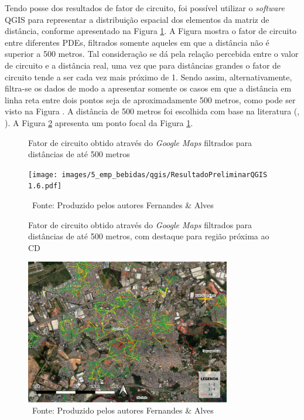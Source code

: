 Tendo posse dos resultados de fator de circuito, foi possível utilizar o \textit{software} QGIS para representar a distribuição espacial dos elementos da matriz de distância, conforme apresentado na Figura \ref{fig:FC_maps2}. 
A Figura mostra o fator de circuito entre diferentes PDEs, filtrados somente aqueles em que a distância não é superior a 500 metros. 
% 
Tal consideração se dá pela relação percebida entre o valor de circuito e a distância real, uma vez que para distâncias grandes o fator de circuito tende a ser cada vez mais próximo de 1.
%
Sendo assim, alternativamente, filtra-se os dados de modo a apresentar somente os casos em que a distância em linha reta entre dois pontos seja de aproximadamente 500 metros, como pode ser visto na Figura . 
%
A distância de 500 metros foi escolhida com base na literatura (, \citeyear{AMARAL2020102916}). 
%
A Figura \ref{fig:FC_maps3} apresenta um ponto focal da Figura \ref{fig:FC_maps2}. 

\begin{figure}[H]
    \centering
    \caption{Fator de circuito obtido através do \textit{Google Maps} filtrados para distâncias de até 500 metros }
    \texttt{[image: images/5\_emp\_bebidas/qgis/ResultadoPreliminarQGIS 1.6.pdf]}
    \caption*{\ Fonte: Produzido pelos autores Fernandes \& Alves}
    \label{fig:FC_maps2}
\end{figure}

\begin{figure}[H]
    \centering
    \caption{Fator de circuito obtido através do \textit{Google Maps} filtrados para distâncias de até 500 metros, com destaque para região próxima ao CD}
    \includegraphics[width=0.8\textwidth]{images/5_emp_bebidas/qgis/ResultadoPreliminarQGIS 1.7.pdf}
    \caption*{\ Fonte: Produzido pelos autores Fernandes \& Alves}
    \label{fig:FC_maps3}
\end{figure}


